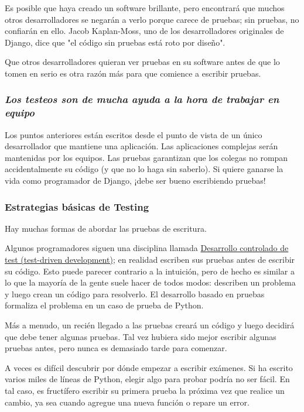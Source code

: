 \documentclass[10pt]{article}
\begin{document}
Es posible que haya creado un software brillante, pero encontrará que muchos otros desarrolladores se negarán a verlo porque carece de pruebas; sin pruebas, no confiarán en ello. Jacob Kaplan-Moss, uno de los desarrolladores originales de Django, dice que "el código sin pruebas está roto por diseño".

Que otros desarrolladores quieran ver pruebas en su software antes de que lo tomen en serio es otra razón más para que comience a escribir pruebas.

\subsubsection*{\textit{Los testeos son de mucha ayuda a la hora de trabajar en equipo}}

Los puntos anteriores están escritos desde el punto de vista de un único desarrollador que mantiene una aplicación. Las aplicaciones complejas serán mantenidas por los equipos. Las pruebas garantizan que los colegas no rompan accidentalmente su código (y que no lo haga sin saberlo). Si quiere ganarse la vida como programador de Django, ¡debe ser bueno escribiendo pruebas!

\subsubsection{Estrategias básicas de Testing}

Hay muchas formas de abordar las pruebas de escritura.

Algunos programadores siguen una disciplina llamada {\href{https://en.wikipedia.org/wiki/Test-driven\_development}{\textcolor{B}{Desarrollo controlado de test (test-driven development)}}}; en realidad escriben sus pruebas antes de escribir su código. Esto puede parecer contrario a la intuición, pero de hecho es similar a lo que la mayoría de la gente suele hacer de todos modos: describen un problema y luego crean un código para resolverlo. El desarrollo basado en pruebas formaliza el problema en un caso de prueba de Python.

Más a menudo, un recién llegado a las pruebas creará un código y luego decidirá que debe tener algunas pruebas. Tal vez hubiera sido mejor escribir algunas pruebas antes, pero nunca es demasiado tarde para comenzar.

A veces es difícil descubrir por dónde empezar a escribir exámenes. Si ha escrito varios miles de líneas de Python, elegir algo para probar podría no ser fácil. En tal caso, es fructífero escribir su primera prueba la próxima vez que realice un cambio, ya sea cuando agregue una nueva función o repare un error.
\end{document}
